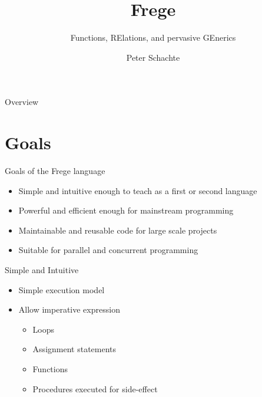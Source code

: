 \documentclass[12pt]{beamer}
\title{Frege}
\subtitle{\textsf{F}unctions, \textsf{RE}lations, and 
pervasive \textsf{GE}nerics}
\author{Peter Schachte}
\institute[Univ.\ Melbourne] %
{
  Department of Computer Science and Software Engineering \\
  University of Melbourne
}
\date{}
\newcommand{\frege}{\textsf{Frege}\xspace}
\begin{document}
\begin{frame}
  \titlepage
\end{frame}

\begin{frame}{Overview}
  \tableofcontents
\end{frame}



\section{Goals}
\begin{frame}{\LARGE Goals of the \frege language}
  \begin{itemize}
  \item Simple and intuitive enough to teach as a first or second language
  \item Powerful and efficient enough for mainstream programming
  \item Maintainable and reusable code for large scale projects
  \item Suitable for parallel and concurrent programming
  \end{itemize}
\end{frame}


\begin{frame}{\large Simple and Intuitive}
  \begin{itemize}
  \item Simple execution model
  \item Allow imperative expression
    \begin{itemize}
    \item Loops
    \item Assignment statements
    \item Functions
    \item Procedures executed for side-effect
    \end{itemize}
  \end{itemize}
\end{frame}
\end{document}
